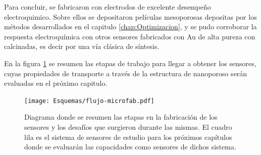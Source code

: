 	Para concluir, se fabricaron con electrodos de excelente desempeño electroquimico. Sobre ellos se depositaron películas mesoporosas depositas por los métodos desarrollados en el capitulo \ref{chap:Optimizacion}, y se pudo corroborar la respuesta electroquímica con otros sensores fabricados con Au de alta pureza con \pdm\space calcinadas, es decir por una vía clásica de síntesis.

	En la figura \ref{fig:flujo-microfab} se resumen las etapas de trabajo para llegar a obtener los sensores, cuyas propiedades de transporte a través de la estructura de nanoporoso serán evaluadas en el próximo capitulo.
				
				\newpage
				
				\begin{figure}[ht!]
		 	       	\texttt{[image: Esquemas/flujo-microfab.pdf]}
		        	\caption[Fabricación de sensores, flujo de procesos.]{Diagrama donde se resumen las etapas en la fabricación de los sensores y los desafíos que surgieron durante las mismas. El cuadro lila es el sistema de sensores de estudio para los próximos capítulos donde se evaluarán las capacidades como sensores de dichos sistema.}
		         	\label{fig:flujo-microfab}
		     		\end{figure}






%
%
%
%
%
%